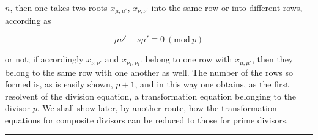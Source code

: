 $n$, then one takes two roots $x_{\mu,\mu'}$, $x_{\nu,\nu'}$
into the same row or into different rows, according as

\[
\mu\nu' - \nu\mu' \equiv 0 \ (\mathrm{mod}\ p)
\]

or not; if accordingly $x_{\nu,\nu'}$ and $x_{\nu_1,\nu_1'}$ belong to one row with
$x_{\mu,\mu'}$, then they belong to the same row with one another as well. The
number of the rows so formed is, as is easily shown,
$p + 1$, and in this way one obtains, as the first resolvent of the
division equation, a transformation equation belonging to the divisor $p$.
We shall show later, by another route, how the
transformation equations for composite divisors can be reduced to
those for prime divisors.

\begin{center}
\rule{3cm}{0.4pt}
\end{center}
